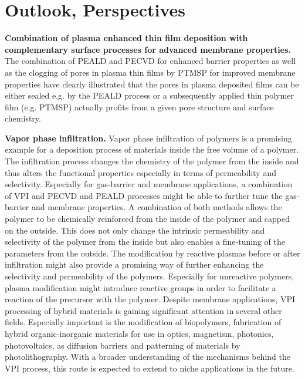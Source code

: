\documentclass[AMA,STIX2COL]{WileyNJD-v2} %
\begin{document}



\section{Outlook, Perspectives}\label{sec6}


\textbf{Combination of plasma enhanced thin film deposition with complementary surface processes for advanced membrane properties.}  The combination of PEALD and PECVD for enhanced barrier properties as well as the clogging of pores in plasma thin films by PTMSP for improved membrane properties have clearly illustrated that the pores in plasma deposited films can be either sealed e.g. by the PEALD process or a subsequently applied thin polymer film (e.g. PTMSP) actually profits from a given pore structure and surface chemistry.

\textbf{Vapor phase infiltration.}
Vapor phase infiltration of polymers is a promising example for a deposition process of materials inside the free volume of a polymer. The infiltration process changes the chemistry of the polymer from the inside and thus alters the functional properties especially in terms of permeability and selectivity. Especially for gas-barrier and membrane applications, a combination of VPI and PECVD and PEALD processes might be able to further tune the gas-barrier and membrane properties. A combination of both methods allows the polymer to be chemically reinforced from the inside of the polymer and capped on the outside. This does not only change the intrinsic permeability and selectivity of the polymer from the inside but also enables a fine-tuning of the parameters from the outside. The modification by reactive plasmas before or after infiltration might also provide a promising way of further enhancing the selectivity and permeability of the polymers. Especially for unreactive polymers, plasma modification might introduce reactive groups in order to facilitate a reaction of the precursor with the polymer. Despite membrane applications, VPI processing of hybrid materials is gaining significant attention in several other fields. Especially important is the modification of biopolymers, fabrication of hybrid organic-inorganic materials for use in optics, magnetism, photonics, photovoltaics, as diffusion barriers and patterning of materials by photolithography. With a broader understanding of the mechanisms behind the VPI process, this route is expected to extend to niche applications in the future.
\end{document}
